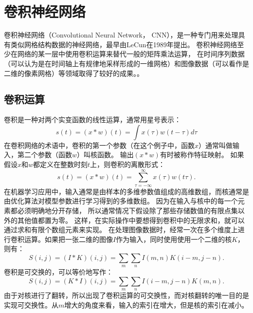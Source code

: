 \section{卷积神经网络}
卷积神经网络（Convolutional Neural Network， CNN），是一种专门用来处理具有类似网格结构数据的神经网络，最早由LeCun在1989年提出\cite{lecun1989backpropagation}。
卷积神经网络至少在网络的某一层中使用卷积运算来替代一般的矩阵乘法运算，
在时间序列数据（可以认为是在时间轴上有规律地采样形成的一维网格）和图像数据（可以看作是二维的像素网格）等领域取得了较好的成果。。\par

\subsection{卷积运算}
\label{sec:the_convolution_operation}
卷积是一种对两个实变函数的线性运算，通常用星号表示：
\begin{equation}
s(t) = (x*w)(t) = \int x(\tau)w(t-\tau)d\tau
\end{equation}
在卷积网络的术语中，卷积的第一个参数（在这个例子中，函数$x$）通常叫做输入，第二个参数（函数$w$）叫核函数。
输出$ (x*w)$有时被称作特征映射。
如果假设$x$和$w$都定义在整数时刻$t$上，则卷积的离散形式：
\begin{equation}
s(t) = (x*w)(t) = \sum_{\tau = -\infty}^{\infty} x(\tau)w(t\tau).
\end{equation}
在机器学习应用中，输入通常是由样本的多维参数值组成的高维数组，而核通常是由优化算法对模型参数进行学习得到的多维数组。
因为在输入与核中的每一个元素都必须明确地分开存储，
所以通常情况下假设除了那些存储数值的有限点集以外的其他值都置为零。
这样，在实际操作中要想得到卷积中的无限求和，就可以通过求和有限个数组元素来实现。
在处理图像数据时，经常一次在多个维度上进行卷积运算。如果把一张二维的图像$I$作为输入，同时使用使用一个二维的核$K$，则有：
\begin{equation}
S(i,j) = (I*K)(i,j) = \sum_m \sum_n I(m,n) K(i-m, j-n).
\end{equation}
卷积是可交换的，可以等价地写作：
\begin{equation}
	S(i, j) = (K*I)(i,j) = \sum_m \sum_n I(i-m, j-n) K(m, n).
\end{equation}
由于对核进行了翻转，所以出现了卷积运算的可交换性，而对核翻转的唯一目的是实现可交换性。从$m$增大的角度来看，输入的索引在增大，但是核的索引在减小。\par


